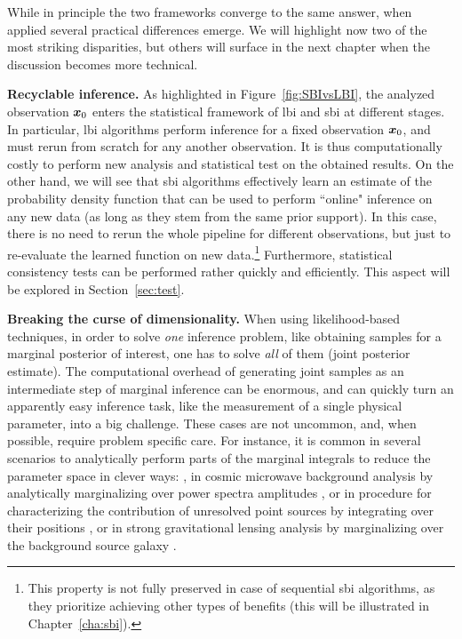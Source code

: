 While in principle the two frameworks converge to the same answer, when applied several practical differences emerge. We will highlight now two of the most striking disparities, but others will surface in the next chapter when the discussion becomes more technical.

\noindent \textbf{Recyclable inference.} As highlighted in Figure~\ref{fig:SBIvsLBI}, the analyzed observation $\bm{x}_0$ enters the statistical framework of \gls*{lbi} and \gls*{sbi} at different stages. In particular, \gls*{lbi} algorithms perform inference for a fixed observation $\bm{x}_0$, and must rerun from scratch for any another observation. It is thus computationally costly to perform new analysis and statistical test on the obtained results. On the other hand, we will see that \gls*{sbi} algorithms effectively learn an estimate of the probability density function that can be used to perform ``online" inference on any new data (as long as they stem from the same prior support). In this case, there is no need to rerun the whole pipeline for different observations, but just to re-evaluate the learned function on new data.\footnote{This property is not fully preserved in case of sequential \gls*{sbi} algorithms, as they prioritize achieving other types of benefits (this will be illustrated in Chapter~\ref{cha:sbi}).} Furthermore, statistical consistency tests can be performed rather quickly and efficiently. This aspect will be explored in Section~\ref{sec:test}.

\noindent \textbf{Breaking the curse of dimensionality.} When using likelihood-based techniques, in order to solve \emph{one} inference problem, like obtaining samples for a marginal posterior of interest, one has to solve \emph{all} of them (joint posterior estimate). The computational overhead of generating joint samples as an intermediate step of marginal inference can be enormous, and can quickly turn an apparently easy inference task, like the measurement of a single physical parameter, into a big challenge. These cases are not uncommon, and, when possible, require problem specific care. For instance, it is common in several scenarios to analytically perform parts of the marginal integrals to reduce the parameter space in clever ways: \eg, in cosmic microwave background analysis by analytically marginalizing over power spectra amplitudes \cite{Gerbino:2019okg}, or in procedure for characterizing the contribution of unresolved point sources by integrating over their positions \cite{Mishra-Sharma:2016gis}, or in strong gravitational lensing analysis by marginalizing over the background source galaxy \cite{Vegetti:2008eg}.

